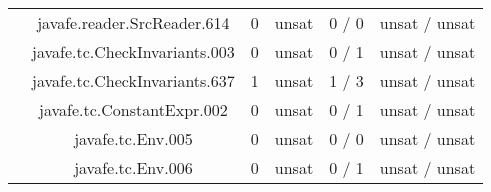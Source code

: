 \begin{table}[htbp]
\begin{minipage}{0.60\textwidth}
{\begin{tabular}[c]{c c!{\vrule width 1.5pt}c|c!{\vrule width 1.5pt}c|c|}
 			& javafe.reader.SrcReader.614		   		      & 0    & unsat   & 0  / 0    & unsat / unsat  \\
 			& javafe.tc.CheckInvariants.003		   		      & 0    & unsat   & 0  / 1    & unsat / unsat  \\
 			& javafe.tc.CheckInvariants.637		   		      & 1    & unsat   & 1  / 3    & unsat / unsat  \\
 			& javafe.tc.ConstantExpr.002		   		      & 0    & unsat   & 0  / 1    & unsat / unsat  \\
 			& javafe.tc.Env.005			   		      & 0    & unsat   & 0  / 0    & unsat / unsat  \\
 			& javafe.tc.Env.006			   		      & 0    & unsat   & 0  / 1    & unsat / unsat  \\
\end{tabular}
} \end{minipage}
\begin{minipage}{0.60\textwidth}
\centering
{}
\end{minipage}
\end{table}
